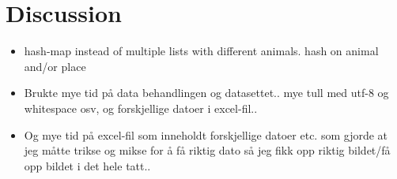 \documentclass[USenglish]{uit-thesis}
\begin{document}
\chapter{Discussion}
\begin{itemize}
\item hash-map instead of multiple lists with different animals. hash on animal and/or place
\item Brukte mye tid på data behandlingen og datasettet.. mye tull med utf-8 og whitespace osv, og forskjellige datoer i excel-fil..
\item Og mye tid på excel-fil som inneholdt forskjellige datoer etc. som gjorde at jeg måtte trikse og mikse for å få riktig dato så jeg fikk opp riktig bildet/få opp bildet i det hele tatt..
\end{itemize}
\end{document}

